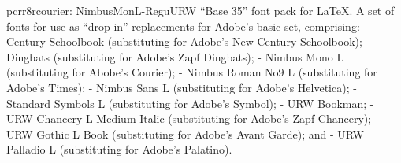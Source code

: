 \documentclass{ddltxtyp}
\begin{document}
\begin{package}{pcrr8r}{courier: NimbusMonL-Regu}{URW ``Base 35'' font pack for {\LaTeX}.}
A set of fonts for use as ``drop-in'' replacements for Adobe's
basic set, comprising: - Century Schoolbook (substituting for
Adobe's New Century Schoolbook); - Dingbats (substituting for
Adobe's Zapf Dingbats); - Nimbus Mono L (substituting for
Abobe's Courier); - Nimbus Roman No9 L (substituting for
Adobe's Times); - Nimbus Sans L (substituting for Adobe's
Helvetica); - Standard Symbols L (substituting for Adobe's
Symbol); - URW Bookman; - URW Chancery L Medium Italic
(substituting for Adobe's Zapf Chancery); - URW Gothic L Book
(substituting for Adobe's Avant Garde); and - URW Palladio L
(substituting for Adobe's Palatino).
\end{package}
\end{document}
